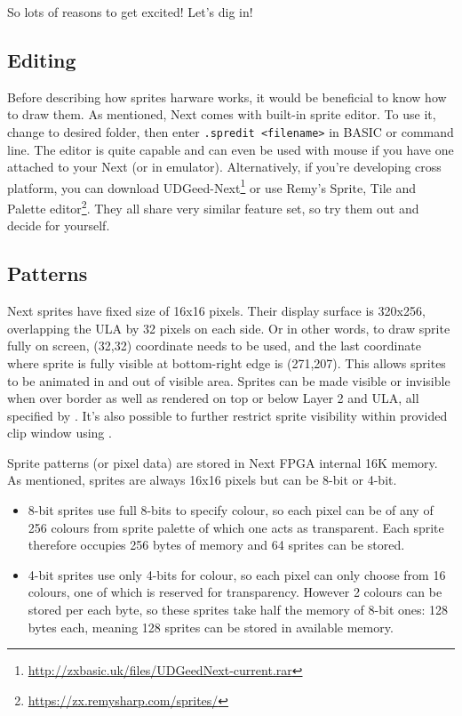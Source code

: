 So lots of reasons to get excited! Let's dig in!

\subsection{Editing}

Before describing how sprites harware works, it would be beneficial to know how to draw them. As mentioned, Next comes with built-in sprite editor. To use it, change to desired folder, then enter {\tt .spredit <filename>} in BASIC or command line. The editor is quite capable and can even be used with mouse if you have one attached to your Next (or in emulator). Alternatively, if you're developing cross platform, you can download UDGeed-Next\footnote{\url{http://zxbasic.uk/files/UDGeedNext-current.rar}} or use Remy's Sprite, Tile and Palette editor\footnote{\url{https://zx.remysharp.com/sprites/}}. They all share very similar feature set, so try them out and decide for yourself.


\subsection{Patterns}

Next sprites have fixed size of 16x16 pixels. Their display surface is 320x256, overlapping the ULA by 32 pixels on each side. Or in other words, to draw sprite fully on screen, (32,32) coordinate needs to be used, and the last coordinate where sprite is fully visible at bottom-right edge is (271,207). This allows sprites to be animated in and out of visible area. Sprites can be made visible or invisible when over border as well as rendered on top or below Layer 2 and ULA, all specified by . It's also possible to further restrict sprite visibility within provided clip window using .

Sprite patterns (or pixel data) are stored in Next FPGA internal 16K memory. As mentioned, sprites are always 16x16 pixels but can be 8-bit or 4-bit.

\begin{itemize}[topsep=1pt,itemsep=1pt]
    \item 8-bit sprites use full 8-bits to specify colour, so each pixel can be of any of 256 colours from sprite palette of which one acts as transparent. Each sprite therefore occupies 256 bytes of memory and 64 sprites can be stored.

    \item 4-bit sprites use only 4-bits for colour, so each pixel can only choose from 16 colours, one of which is reserved for transparency. However 2 colours can be stored per each byte, so these sprites take half the memory of 8-bit ones: 128 bytes each, meaning 128 sprites can be stored in available memory.
\end{itemize}


